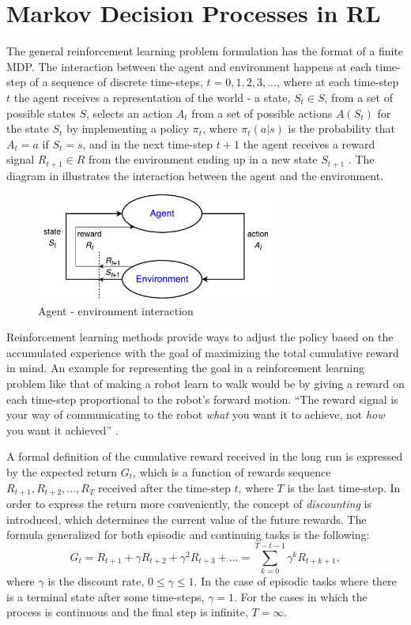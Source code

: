 \section{Markov Decision Processes in RL}\label{MDPs}
The general reinforcement learning problem formulation has the format of a finite MDP. The interaction between the agent and environment happens at each time-step of a sequence of discrete time-steps, $t=0,1,2,3,...$, where at each time-step $t$ the agent receives a representation of the world - a state, $S_{t}\in S$, from a set of possible states $S$, selects an action $A_{t}$ from a set of possible actions $A(S_{t})$ for the state $S_{t}$ by implementing a policy $\pi_{t}$, where $\pi_{t}(a|s)$ is the probability that $A_{t}=a$ if $S_{t}=s$, and in the next time-step $t+1$ the agent receives a reward signal $R_{t+1}\in R$ from the environment ending up in a new state $S_{t+1}$ \cite{Sutton}. The diagram in  illustrates the interaction between the agent and the environment.
\begin{figure}[H]
	\centering
	\includegraphics[width=0.7\textwidth]{Figures/Agent-EnvironmentInteraction}
	\caption{Agent - environment interaction}
	\label{fig:AgentEnv}
\end{figure}
Reinforcement learning methods provide ways to adjust the policy based on the accumulated experience with the goal of maximizing the total cumulative reward in mind. An example for representing the goal in a reinforcement learning problem like that of making a robot learn to walk would be by giving a reward on each time-step proportional to the robot's forward motion. “The reward signal is your way of communicating to the robot \textit{what} you want it to achieve, not \textit{how} you want it achieved” \cite{Sutton}.

A formal definition of the cumulative reward received in the long run is expressed by the expected return $G_{t}$, which is a function of rewards sequence $R_{t+1},R_{t+2},...,R_{T}$ received after the time-step $t$, where $T$ is the last time-step. In order to express the return more conveniently, the concept of \textit{discounting} is introduced, which determines the current value of the future rewards. The formula generalized for both episodic and continuing tasks is the following: 
\begin{equation}
G_{t}=R_{t+1}+\gamma R_{t+2}+\gamma ^2R_{t+3}+...=\sum_{k=0}^{T-t-1}\gamma ^kR_{t+k+1}, 
\end{equation}
where $\gamma$ is the discount rate, $0\leq \gamma\leq1$. In the case of episodic tasks where there is a terminal state after some time-steps, $\gamma=1$. For the cases in which the process is continuous and the final step is infinite, $T=\infty$. 

